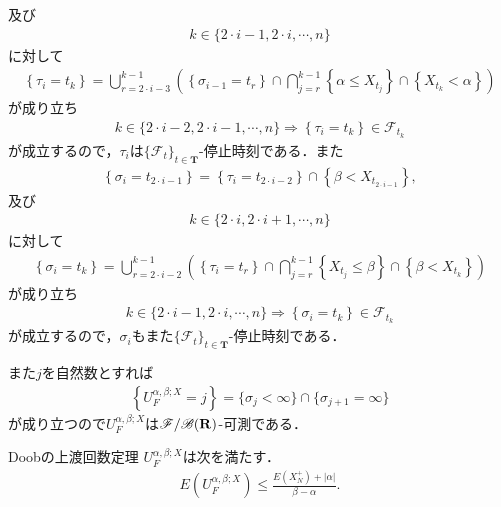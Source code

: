 	及び
	\begin{align}
		k \in \{2 \cdot i - 1,2 \cdot i,\cdots,n\}
	\end{align}
	に対して
	\begin{align}
		\left\{\tau_i = t_k\right\} = 
		\bigcup_{r=2 \cdot i-3}^{k-1}\left( \left\{\sigma_{i-1}=t_r\right\} \cap \bigcap_{j=r}^{k-1} \left\{\alpha \leq X_{t_j}\right\} \cap \left\{X_{t_k} < \alpha\right\} \right)
	\end{align}
	が成り立ち
	\begin{align}
		k \in \{2 \cdot i-2,2 \cdot i-1,\cdots,n\} \Longrightarrow \left\{\tau_i = t_k\right\} \in \mathscr{F}_{t_k}
 	\end{align}
 	が成立するので，$\tau_i$は$\{\mathscr{F}_t\}_{t \in \mathbf{T}}$-停止時刻である．また
 	\begin{align}
		\left\{\sigma_i = t_{2 \cdot i-1}\right\} = \left\{\tau_i = t_{2 \cdot i-2}\right\} \cap \left\{\beta < X_{t_{2 \cdot i-1}}\right\},
	\end{align}
	及び
	\begin{align}
		k \in \{2 \cdot i,2 \cdot i+1,\cdots,n\}
	\end{align}
	に対して
	\begin{align}
		\left\{\sigma_i = t_k\right\} = 
		\bigcup_{r=2 \cdot i-2}^{k-1}\left( \left\{\tau_i=t_r\right\} \cap \bigcap_{j=r}^{k-1} \left\{X_{t_j} \leq \beta\right\} \cap \left\{\beta < X_{t_k}\right\} \right)
	\end{align}
	が成り立ち
	\begin{align}
		k \in \{2 \cdot i - 1,2 \cdot i,\cdots,n\} \Longrightarrow \left\{\sigma_i = t_k\right\} \in \mathscr{F}_{t_k}
 	\end{align}
 	が成立するので，$\sigma_i$もまた$\{\mathscr{F}_t\}_{t \in \mathbf{T}}$-停止時刻である．
 	
 	また$j$を自然数とすれば
 	\begin{align}
 		\left\{U_F^{\alpha,\beta;X} = j\right\} = \{\sigma_j < \infty\} \cap \{\sigma_{j+1} = \infty\}
 	\end{align}
 	が成り立つので$U_F^{\alpha,\beta;X}$は$\mathscr{F}/\mathscr{B}(\mathbf{R})$-可測である．
 	
 	\begin{itembox}[l]{Doobの上渡回数定理}
 		$U_F^{\alpha,\beta;X}$は次を満たす．
 		\begin{align}
 			E\left( U_F^{\alpha,\beta;X} \right) \leq \frac{E(X_N^+) + |\alpha|}{\beta - \alpha}.
 		\end{align}
 	\end{itembox}
 	
